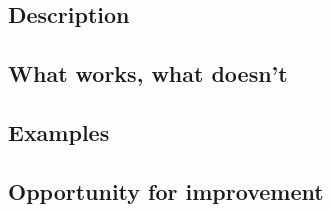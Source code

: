 \subsection{Description}
\subsection{What works, what doesn't}
\subsection{Examples}
\subsection{Opportunity for improvement}
